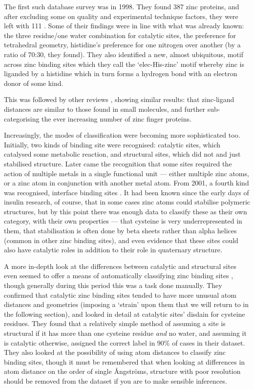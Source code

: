 The first such database survey was in 1998. They found 387 zinc proteins, and after excluding some on quality and experimental technique factors, they were left with 111 \cite{alberts1998analysis}. Some of their findings were in line with what was already known: the three residue/one water combination for catalytic sites, the preference for tetrahedral geometry, histidine's preference for one nitrogen over another (by a ratio of 70:30, they found). They also identified a new, almost ubiquitous, motif across zinc binding sites which they call the `elec-His-zinc' motif whereby zinc is liganded by a histidine which in turn forms a hydrogen bond with an electron donor of some kind.

This was followed by other reviews \cite{roe1999zinc,laity2001zinc,grishin2001treble,harding2001geometry,krishna2003structural}, showing similar results: that zinc-ligand distances are similar to those found in small molecules, and further sub-categorising the ever increasing number of zinc finger proteins.

Increasingly, the modes of classification were becoming more sophisticated too. Initially, two kinds of binding site were recognised: catalytic sites, which catalysed some metabolic reaction, and structural sites, which did not and just stabilised structure. Later came the recognition that some sites required the action of multiple metals in a single functional unit --- either multiple zinc atoms, or a zinc atom in conjunction with another metal atom. From 2001, a fourth kind was recognised, interface binding sites \cite{auld2001zinc}. It had been known since the early days of insulin research, of course, that in some cases zinc atoms could stabilise polymeric structures, but by this point there was enough data to classify these as their own category, with their own properties --- that cysteine is very underrepresented in them, that stabilisation is often done by beta sheets rather than alpha helices (common in other zinc binding sites), and even evidence that these sites could also have catalytic roles in addition to their role in quaternary structure.

A more in-depth look at the differences between catalytic and structural sites even seemed to offer a means of automatically classifying zinc binding sites \cite{lee2008physical}, though generally during this period this was a task done manually. They confirmed that catalytic zinc binding sites tended to have more unusual atom distances and geometries (imposing a `strain' upon them that we will return to in the following section), and looked in detail at catalytic sites' disdain for cysteine residues. They found that a relatively simple method of assuming a site is structural if it has more than one cysteine residue \textit{and} no water, and assuming it is catalytic otherwise, assigned the correct label in 90\% of cases in their dataset. They also looked at the possibility of using atom distances to classify zinc binding sites, though it must be remembered that when looking at differences in atom distance on the order of single {\AA}ngstr\"{o}ms, structure with poor resolution should be removed from the dataset if you are to make sensible inferences.

